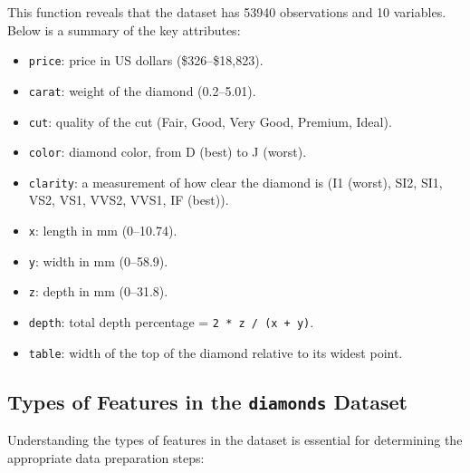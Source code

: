 \documentclass[
]{book}
\newcommand{\passthrough}[1]{#1}
\providecommand{\tightlist}{%
  \setlength{\itemsep}{0pt}\setlength{\parskip}{0pt}}
\theoremstyle{definition}
\theoremstyle{definition}
\theoremstyle{definition}
\theoremstyle{definition}
\theoremstyle{remark}
\begin{document}
This function reveals that the dataset has 53940 observations and 10 variables. Below is a summary of the key attributes:

\begin{itemize}
\tightlist
\item
  \passthrough{\lstinline!price!}: price in US dollars (\$326--\$18,823).
\item
  \passthrough{\lstinline!carat!}: weight of the diamond (0.2--5.01).
\item
  \passthrough{\lstinline!cut!}: quality of the cut (Fair, Good, Very Good, Premium, Ideal).
\item
  \passthrough{\lstinline!color!}: diamond color, from D (best) to J (worst).
\item
  \passthrough{\lstinline!clarity!}: a measurement of how clear the diamond is (I1 (worst), SI2, SI1, VS2, VS1, VVS2, VVS1, IF (best)).
\item
  \passthrough{\lstinline!x!}: length in mm (0--10.74).
\item
  \passthrough{\lstinline!y!}: width in mm (0--58.9).
\item
  \passthrough{\lstinline!z!}: depth in mm (0--31.8).
\item
  \passthrough{\lstinline!depth!}: total depth percentage = \passthrough{\lstinline!2 * z / (x + y)!}.
\item
  \passthrough{\lstinline!table!}: width of the top of the diamond relative to its widest point.
\end{itemize}

\subsection*{\texorpdfstring{Types of Features in the \texttt{diamonds} Dataset}{Types of Features in the diamonds Dataset}}\label{types-of-features-in-the-diamonds-dataset}

Understanding the types of features in the dataset is essential for determining the appropriate data preparation steps:
\end{document}
